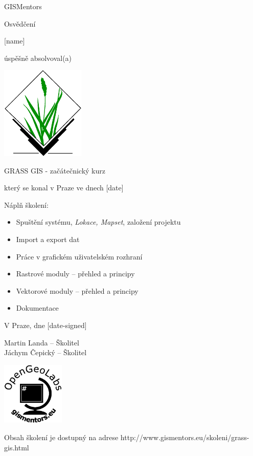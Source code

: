 \documentclass[12pt, a4paper]{letter}
\begin{document}
\pagestyle{empty}
\begin{center}

{\Large GISMentors}

{\Huge Osvědčení}

{\Large [name]}

úspěšně absolvoval(a)

\includegraphics[width=0.30\textwidth]{../images/grasslogo_vector.eps}

{\Large GRASS GIS - začátečnický kurz}

který se konal v Praze ve dnech [date]
\end{center}

Náplň školení:

\begin{itemize}
    \item Spuštění systému, \emph{Lokace, Mapset}, založení projektu
    \item Import a export dat
    \item Práce v grafickém uživatelském rozhraní
    \item Rastrové moduly – přehled a principy
    \item Vektorové moduly – přehled a principy
    \item Dokumentace
\end{itemize}

\vfill
\parbox{7cm}{

    V Praze, dne [date-signed]\\

\vfill

    Martin Landa -- Školitel\\

\vfill
    Jáchym Čepický -- Školitel
}
\hfill
\parbox{3cm}{
    \includegraphics[width=3cm]{../images/placka.eps}
}

\vfill

\begin{center}
{\footnotesize Obsah školení je dostupný na adrese
http://www.gismentors.eu/skoleni/grass-gis.html}
\end{center}
\end{document}
